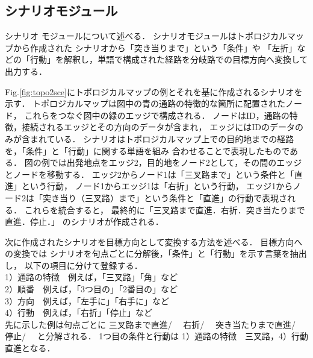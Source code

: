\documentclass{sice-si}
\begin{document}
\subsection{シナリオモジュール}
シナリオ
モジュールについて述べる．
シナリオモジュールはトポロジカルマップから作成された
シナリオから「突き当りまで」という「条件」や
「左折」などの「行動」を解釈し，単語で構成された経路を分岐路での目標方向へ変換して出力する．
\par
Fig.\ref{fig:topo2sce}にトポロジカルマップの例とそれを基に作成されるシナリオを示す．
トポロジカルマップは図中の青の通路の特徴的な箇所に配置されたノード，
これらをつなぐ図中の緑のエッジで構成される．
ノードはID，通路の特徴，接続されるエッジとその方向のデータが含まれ，
エッジにはIDのデータのみが含まれている．
シナリオはトポロジカルマップ上での目的地までの経路を，「条件」と「行動」に関する単語を組み
合わせることで表現したものである．
図の例では出発地点をエッジ2，目的地をノード2として，その間のエッジとノードを移動する．
エッジ2からノード1は「三叉路まで」という条件と「直進」という行動，
ノード1からエッジ1は「右折」という行動，
エッジ1からノード2は「突き当り（三叉路）まで」という条件と「直進」の行動で表現される．
これらを統合すると，
最終的に「三叉路まで直進．右折．突き当たりまで直進．停止．」
のシナリオが作成される．\par
次に作成されたシナリオを目標方向として変換する方法を述べる．
目標方向への変換では
シナリオを句点ごとに分解後，「条件」と「行動」を示す言葉を抽出し，
以下の項目に分けて登録する．\\
1）通路の特徴　例えば，「三叉路」「角」など\\
2）順番　例えば，「3つ目の」「2番目の」など\\
3）方向　例えば，「左手に」「右手に」など\\
4）行動　例えば，「右折」「停止」など\\
先に示した例は句点ごとに
三叉路まで直進/　
右折/　
突き当たりまで直進/　
停止/　
と分解される．
1つ目の条件と行動は
1）通路の特徴　三叉路，4）行動　直進となる．
\end{document}
